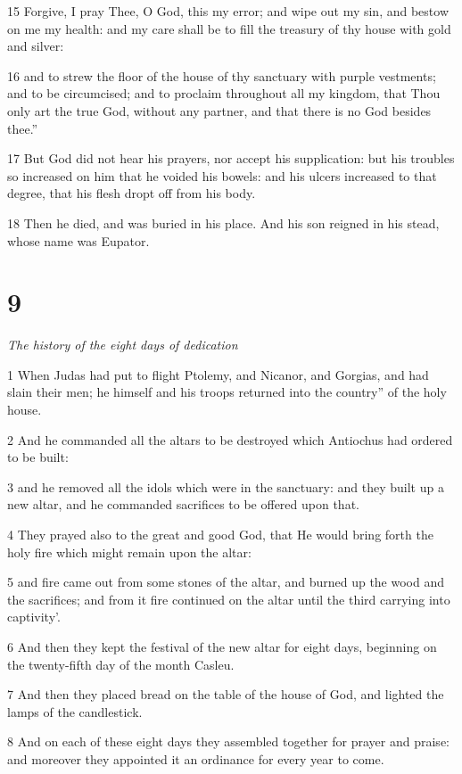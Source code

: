 15 Forgive, I pray Thee, O God, this my error; and wipe out my sin, and bestow on me my health: and my care shall be to fill the treasury of thy house with gold and silver: 

16 and to strew the floor of the house of thy sanctuary with purple vestments; and to be circumcised; and to proclaim throughout all my kingdom, that Thou only art the true God, without any partner, and that there is no God besides thee.” 

17 But God did not hear his prayers, nor accept his supplication: but his troubles so increased on him that he voided his bowels: and his ulcers increased to that degree, that his flesh dropt off from his body. 

18 Then he died, and was buried in his place. And his son reigned in his stead, whose name was Eupator.

\chapter{9}

\par \textit{The history of the eight days of dedication}

1 When Judas had put to flight Ptolemy, and Nicanor, and Gorgias, and had slain their men; he himself and his troops returned into the country” of the holy house. 

2 And he commanded all the altars to be destroyed which Antiochus had ordered to be built: 

3 and he removed all the idols which were in the sanctuary: and they built up a new altar, and he commanded sacrifices to be offered upon that. 

4 They prayed also to the great and good God, that He would bring forth the holy fire which might remain upon the altar: 

5 and fire came out from some stones of the altar, and burned up the wood and the sacrifices; and from it fire continued on the altar until the third carrying into captivity’. 

6 And then they kept the festival of the new altar for eight days, beginning on the twenty-fifth day of the month Casleu. 

7 And then they placed bread on the table of the house of God, and lighted the lamps of the candlestick. 

8 And on each of these eight days they assembled together for prayer and praise: and moreover they appointed it an ordinance for every year to come. 

